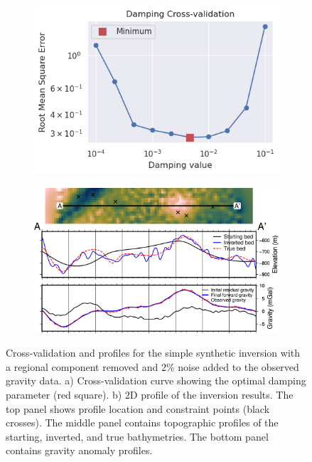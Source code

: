 \begin{figure}[!ht]
  \centering
    \begin{subfigure}[t]{.40\textwidth}
        \centering
        \includegraphics[width=\textwidth]{figures/chp3/chp3_simple_regional_noise_CV.png}
        \caption{}
    \end{subfigure}
    \begin{subfigure}[t]{.58\textwidth}
        \centering
        \includegraphics[width=\textwidth]{figures/chp3/chp3_simple_regional_noise_profile.png}
        \caption{}
    \end{subfigure}
  \caption[Synthetic inversion with regional and noise, CV and profile]{Cross-validation and profiles for the simple synthetic inversion with a regional component removed and 2\% noise added to the observed gravity data. a) Cross-validation curve showing the optimal damping parameter (red square). b) 2D profile of the inversion results. The top panel shows profile location and constraint points (black crosses). The middle panel contains topographic profiles of the starting, inverted, and true bathymetries. The bottom panel contains gravity anomaly profiles.}
    \label{fig:appB_simple_regional_noise_CV_and_profile}
\end{figure}

